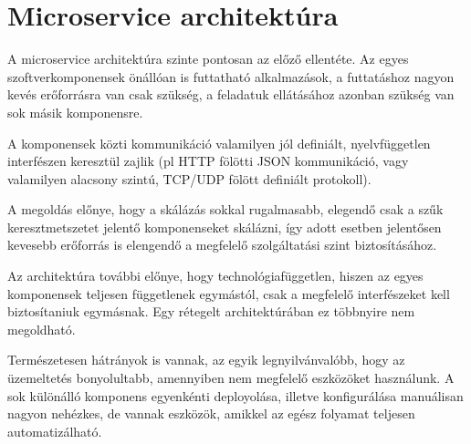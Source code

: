 \section{Microservice architektúra}

A microservice architektúra szinte pontosan az előző ellentéte.
Az egyes szoftverkomponensek önállóan is futtatható alkalmazások,
a futtatáshoz nagyon kevés erőforrásra van csak szükség, a feladatuk
ellátásához azonban szükség van sok másik komponensre.

A komponensek közti kommunikáció valamilyen jól definiált, nyelvfüggetlen
interfészen keresztül zajlik (pl HTTP fölötti JSON kommunikáció, vagy
valamilyen alacsony szintú, TCP/UDP fölött definiált protokoll).

A megoldás előnye, hogy a skálázás sokkal rugalmasabb, elegendő csak a szűk
keresztmetszetet jelentő komponenseket skálázni, így adott esetben
jelentősen kevesebb erőforrás is elengendő a megfelelő szolgáltatási
szint biztosításához.

Az architektúra további előnye, hogy technológiafüggetlen, hiszen az egyes
komponensek teljesen függetlenek egymástól, csak a megfelelő interfészeket
kell biztosítaniuk egymásnak. Egy rétegelt architektúrában ez többnyire nem
megoldható.

Természetesen hátrányok is vannak, az egyik legnyilvánvalóbb, hogy az
üzemeltetés bonyolultabb, amennyiben nem megfelelő eszközöket használunk.
A sok különálló komponens egyenkénti deployolása, illetve konfigurálása
manuálisan nagyon nehézkes, de vannak eszközök, amikkel az egész folyamat
teljesen automatizálható.
